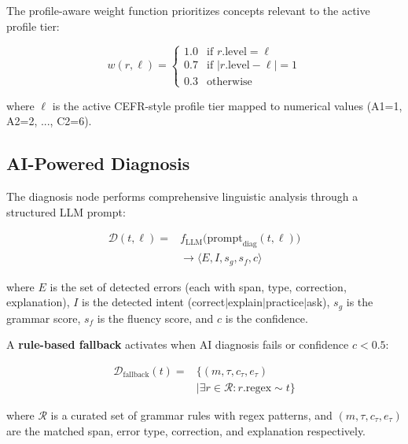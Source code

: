 \documentclass[11pt,a4paper,twocolumn]{article}
\begin{document}
The profile-aware weight function prioritizes concepts relevant to the active profile tier:

\begin{equation}
\label{eq:pedweight}
  w(r, \ell) = \begin{cases}
    1.0 & \text{if } r.\text{level} = \ell \\
    0.7 & \text{if } |r.\text{level} - \ell| = 1 \\
    0.3 & \text{otherwise}
  \end{cases}
\end{equation}

\noindent where $\ell$ is the active CEFR-style profile tier mapped to numerical values (A1=1, A2=2, ..., C2=6).

\subsection{AI-Powered Diagnosis}

The diagnosis node performs comprehensive linguistic analysis through a structured LLM prompt:

\begin{equation}
\begin{aligned}
\mathcal{D}(t, \ell) ={}& f_\text{LLM}\big(\text{prompt}_\text{diag}(t, \ell)\big) \\
& \rightarrow \langle E, I, s_g, s_f, c \rangle
\end{aligned}
\end{equation}

\noindent where $E$ is the set of detected errors (each with span, type, correction, explanation), $I$ is the detected intent (correct$|$explain$|$practice$|$ask), $s_g$ is the grammar score, $s_f$ is the fluency score, and $c$ is the confidence.

A \textbf{rule-based fallback} activates when AI diagnosis fails or confidence $c < 0.5$:

\begin{equation}
\begin{aligned}
\mathcal{D}_\text{fallback}(t) ={}& \{(m, \tau, c_\tau, e_\tau) \\
& \mid \exists r \in \mathcal{R}: r.\text{regex} \sim t\}
\end{aligned}
\end{equation}

\noindent where $\mathcal{R}$ is a curated set of grammar rules with regex patterns, and $(m, \tau, c_\tau, e_\tau)$ are the matched span, error type, correction, and explanation respectively.
\end{document}
